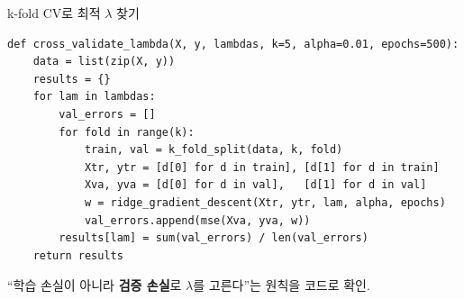 \documentclass[aspectratio=169,11pt]{beamer}
\begin{document}
\begin{frame}[fragile]{k-fold CV로 최적 $\lambda$ 찾기}
  \small
\begin{lstlisting}
def cross_validate_lambda(X, y, lambdas, k=5, alpha=0.01, epochs=500):
    data = list(zip(X, y))
    results = {}
    for lam in lambdas:
        val_errors = []
        for fold in range(k):
            train, val = k_fold_split(data, k, fold)
            Xtr, ytr = [d[0] for d in train], [d[1] for d in train]
            Xva, yva = [d[0] for d in val],   [d[1] for d in val]
            w = ridge_gradient_descent(Xtr, ytr, lam, alpha, epochs)
            val_errors.append(mse(Xva, yva, w))
        results[lam] = sum(val_errors) / len(val_errors)
    return results
\end{lstlisting}
  ``학습 손실이 아니라 \textbf{검증 손실}로 $\lambda$를 고른다''는 원칙을
  코드로 확인.
\end{frame}

\end{document}
